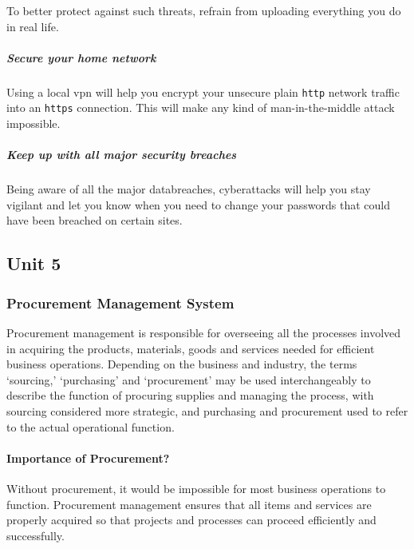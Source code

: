 \documentclass[twocolumn, 12pt, a4paper]{article}
\begin{document}
To better protect against such threats, refrain from uploading everything you
do in real life.

\subsubsection{Secure your home network}
Using a local vpn will help you encrypt your unsecure plain \verb+http+ network
traffic into an \verb+https+ connection. This will make any kind of
man-in-the-middle attack impossible.

\subsubsection{Keep up with all major security breaches}
Being aware of all the major databreaches, cyberattacks will help you stay
vigilant and let you know when you need to change your passwords that could
have been breached on certain sites.




\newpage
\begin{tcolorbox}
  \part{Unit 5}
\end{tcolorbox}

\section{Procurement Management System}
Procurement management is responsible for overseeing all the processes involved
in acquiring the products, materials, goods and services needed for efficient
business operations. Depending on the business and industry, the terms
`sourcing,' `purchasing' and `procurement' may be used interchangeably to
describe the function of procuring supplies and managing the process, with
sourcing considered more strategic, and purchasing and procurement used to
refer to the actual operational function.

\subsection{Importance of Procurement?}
Without procurement, it would be impossible for most business operations to
function. Procurement management ensures that all items and services are
properly acquired so that projects and processes can proceed efficiently and
successfully.
\end{document}
